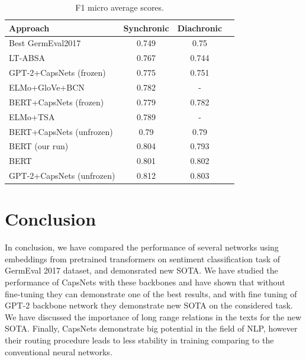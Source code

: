 \documentclass{article}
\begin{document}
\begin{table}[tbh!]
\begin{center}	
\begin{tabular}[t]{|l|ccc|}
\hline
Approach & Synchronic  & Diachronic \\
\hline
Best GermEval2017 \cite{germevaltask2017} & 0.749 & 0.75  \\ %
LT-ABSA \cite{ruppert2017lt} & 0.767 & 0.744 \\
GPT-2+CapsNets (frozen) & 0.775 & 0.751 \\
ELMo+GloVe+BCN \cite{biesialska2020sentiment} & 0.782 & - \\
BERT+CapsNets (frozen) & 0.779 & 0.782\\
ELMo+TSA \cite{biesialska2020sentiment} & 0.789 & - \\
BERT+CapsNets (unfrozen) & 0.79 & 0.79 \\
BERT (our run) & 0.804 & 0.793 \\
BERT \cite{kostic2020} & 0.801 & 0.802 \\
GPT-2+CapsNets (unfrozen) & 0.812 & 0.803\\
\hline
\end{tabular}
\caption{F1 micro average scores.}
\label{tab:sent}
\end{center}
\end{table}

\section{Conclusion}
In conclusion, we have compared the performance of several networks using embeddings from pretrained transformers on sentiment classification task of GermEval 2017 dataset, and demonsrated new SOTA. We have studied the performance of CapsNets with these backbones and have shown that without fine-tuning they can demonstrate one of the best results, and with fine tuning of GPT-2 backbone network they demonstrate new SOTA on the considered task. We have discussed the importance of long range relations in the texts for the new SOTA. Finally, CapsNets demonstrate big potential in the field of NLP, however their routing procedure leads to less stability in training comparing to the conventional neural networks.


\end{document}
